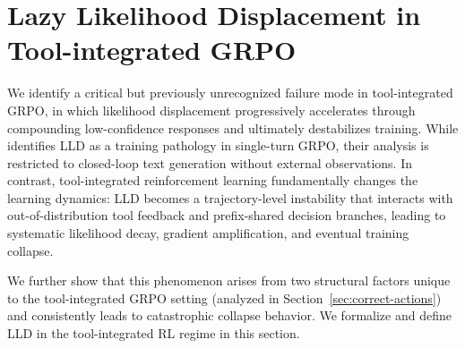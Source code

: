 \section{Lazy Likelihood Displacement in Tool-integrated GRPO}
We identify a critical but previously unrecognized failure mode in tool-integrated GRPO, in which likelihood displacement progressively accelerates through compounding low-confidence responses and ultimately destabilizes training. While \cite{deng2025effect} identifies LLD as a training pathology in single-turn GRPO, their analysis is restricted to closed-loop text generation without external observations. In contrast, tool-integrated reinforcement learning fundamentally changes the learning dynamics: LLD becomes a trajectory-level instability that interacts with out-of-distribution tool feedback and prefix-shared decision branches, leading to systematic likelihood decay, gradient amplification, and eventual training collapse.

We further show that this phenomenon arises from two structural factors unique to the tool-integrated GRPO setting (analyzed in Section~\ref{sec:correct-actions}) and consistently leads to catastrophic collapse behavior. We formalize and define LLD in the tool-integrated RL regime in this section.

